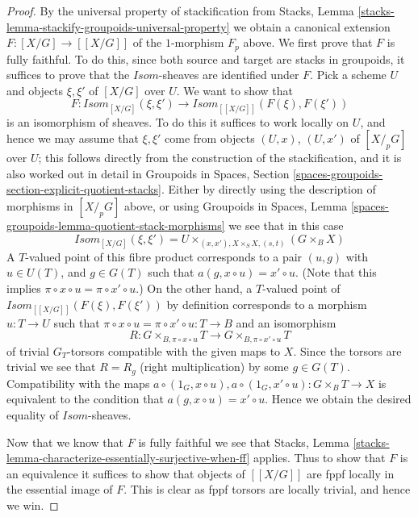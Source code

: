 \begin{proof}
\medskip\noindent
By the universal property of stackification from
Stacks, Lemma \ref{stacks-lemma-stackify-groupoids-universal-property}
we obtain a canonical extension $F : [X/G] \to [[X/G]]$ of the $1$-morphism
$F_p$ above. We first prove that $F$ is fully faithful.
To do this, since both source and target are stacks in groupoids,
it suffices to prove that the $\mathit{Isom}$-sheaves are identified
under $F$. Pick a scheme $U$ and objects $\xi, \xi'$ of
$[X/G]$ over $U$. We want to show that
$$
F :
\mathit{Isom}_{[X/G]}(\xi, \xi')
\longrightarrow
\mathit{Isom}_{[[X/G]]}(F(\xi), F(\xi'))
$$
is an isomorphism of sheaves. To do this it suffices to work locally
on $U$, and hence we may assume that $\xi, \xi'$ come from objects
$(U, x)$, $(U, x')$ of $[X/_{\!p}G]$ over $U$; this follows directly
from the construction of the stackification, and it is also worked
out in detail in
Groupoids in Spaces,
Section \ref{spaces-groupoids-section-explicit-quotient-stacks}.
Either by directly using the description of morphisms in
$[X/_{\!p}G]$ above, or using
Groupoids in Spaces,
Lemma \ref{spaces-groupoids-lemma-quotient-stack-morphisms}
we see that in this case
$$
\mathit{Isom}_{[X/G]}(\xi, \xi') =
U \times_{(x, x'), X \times_S X, (s, t)} (G \times_B X)
$$
A $T$-valued point of this fibre product corresponds to a pair
$(u, g)$ with $u \in U(T)$, and $g \in G(T)$ such that
$a(g, x \circ u) = x' \circ u$. (Note that this implies
$\pi \circ x \circ u = \pi \circ x' \circ u$.)
On the other hand, a $T$-valued
point of $\mathit{Isom}_{[[X/G]]}(F(\xi), F(\xi'))$ by definition
corresponds to a morphism $u : T \to U$ such that
$\pi \circ x \circ u = \pi \circ x' \circ u : T \to B$ and an isomorphism
$$
R :
G \times_{B, \pi \circ x \circ u} T
\longrightarrow
G \times_{B, \pi \circ x' \circ u} T
$$
of trivial $G_T$-torsors compatible with the given maps to $X$.
Since the torsors are trivial we see that $R = R_g$ (right multiplication)
by some $g \in G(T)$. Compatibility with the maps
$a \circ (1_G, x \circ u), a \circ (1_G, x' \circ u) : G \times_B T \to X$
is equivalent to the condition that $a(g, x \circ u) = x' \circ u$.
Hence we obtain the desired equality of $\mathit{Isom}$-sheaves.

\medskip\noindent
Now that we know that $F$ is fully faithful we see that
Stacks, Lemma \ref{stacks-lemma-characterize-essentially-surjective-when-ff}
applies. Thus to show that $F$ is an equivalence it suffices
to show that objects of $[[X/G]]$ are fppf locally in the essential image
of $F$. This is clear as fppf torsors are locally trivial, and hence
we win.
\end{proof}






